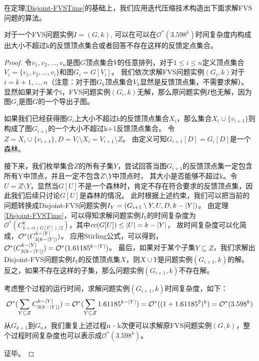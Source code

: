 在定理\ref{Disjoint-FVSTime}的基础上，我们应用迭代压缩技术构造出下面求解FVS问题的算法。
\begin{theorem}
对于一个FVS问题实例$I = (G, k)$, 可以在可以在$\mathcal{O}^*(3.598^k)$时间复杂度内构成出大小不超过k的反馈顶点集合或者回答不存在这样的反馈定点集合。
\end{theorem}
\begin{proof}
令$v_1, v_2, ..., v_n$是图$G$顶点集合$V$的任意排列，对于$1 \le i \le n$定义顶点集合$V_i = \{v_1, v_2, ..., v_i\}$和图$G_i = G[V_i]$。
我们依次求解FVS问题实例$(G_i, k)$对于$i = k+1, ..., n$（注意：对于图$G_k$顶点集合$V_k$显然是反馈顶点集，不需要求解）。
显然如果对于某个i，FVS问题实例$(G_i, k)$无解，那么原问题实例$I$也无解，因为图$G_i$是图$G$的一个导出子图。

如果我们已经获得图$G_i$上大小不超过k的反馈顶点集合$X_i$，那么集合$X_i \cup \{v_{i+1}\}$则构成了图$G_{i+1}$的一个大小不超过k+1反馈顶点集合。
令$Z = X_i \cup \{v_{i+1}\}, D = V_i \setminus X_i = V_{i+1} \setminus Z$。
由定义可知$G_{i+1}[D] = G_i[D]$是一个森林。

接下来，我们枚举集合$Z$的所有子集$Y$，尝试回答当图$G_{i+1}$的反馈顶点集一定包含所有Y中顶点，并且一定不包含$Z \setminus Y$中顶点时，
其大小是否能够不超过k。令$U = Z \setminus Y$，显然当$G[U]$不是一个森林时，肯定不存在符合要求的反馈顶点集，因此我们后续只讨论$G[U]$是森林的情况。
此时根据上述约束，我们可以把当前的问题转换成Disjoint-FVS问题实例$I_Y = (G_{i+1} \setminus Y, U, D, k-\left\vert Y \right\vert)$。
由定理\ref{Disjoint-FVSTime}，可以得知求解问题实例$I_Y$的时间复杂度为$\mathcal{O}^*(C^k_{k + cc(G[U])/2})$，其中$cc(G[U]) \le \left\vert U \right\vert = k - \left\vert Y \right\vert$，
故时间复杂度可以化简成，$\mathcal{O}^*(C^{k - \left\vert Y \right\vert}_{3(k - \left\vert Y \right\vert)})$。
应用Stirling公式，可以得到，$\mathcal{O}^*(C^{k - \left\vert Y \right\vert}_{3(k - \left\vert Y \right\vert)}) = \mathcal{O}^*(1.61185^{k - \left\vert Y \right\vert})$。
最后，如果对于某个子集$Y \subseteq Z$，我们求解出Disjoint-FVS问题实例$I_Y$的反馈顶点集$X$，则$X \cup Y$是问题实例$(G_{i+1}, k)$的解。
反之，如果不存在这样的子集，那么问题实例$(G_{i+1}, k)$不存在解。

考虑整个过程的运行时间，求解问题实例$(G_{i+1}, k)$时间复杂度，如下：
\begin{equation*}
  \mathcal{O}^*(\sum_{Y \subseteq Z}C^{k - \left\vert Y \right\vert}_{3(k - \left\vert Y \right\vert)}) \\
   = \mathcal{O}^*(\sum_{Y \subseteq Z}1.61185^{k - \left\vert Y \right\vert})
   = \mathcal{O}^*((1 + 1.61185^2)^k) = \mathcal{O}^*(3.598^k)
\end{equation*}
从$G_{k+1}$到$G_n$，我们重复上述过程n - k次便可以求解原FVS问题实例$(G, k)$，整个过程时间复杂度也可以表示成$\mathcal{O}^*(3.598^k)$。

证毕。
\end{proof}
